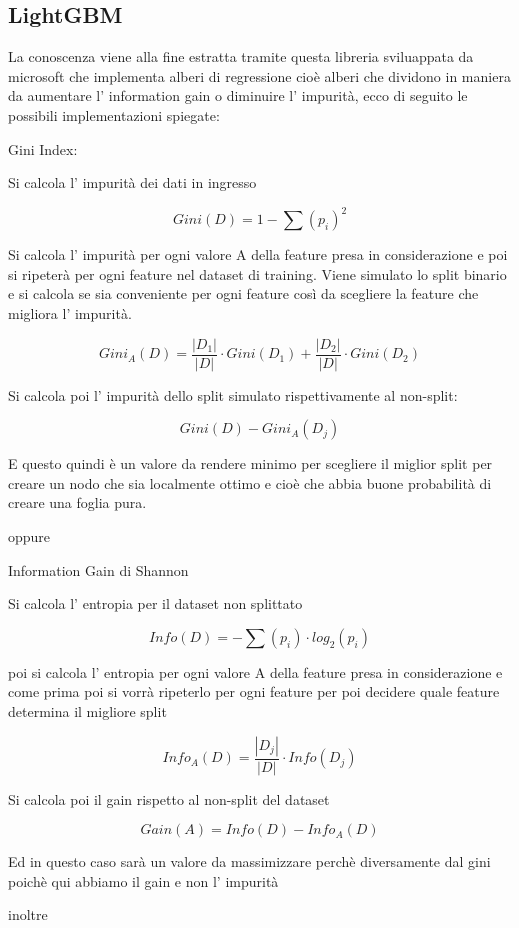 \documentclass[11pt]{article}
\begin{document}
\subsection{LightGBM}\label{lightgbm}

La conoscenza viene alla fine estratta tramite questa libreria
sviluappata da microsoft che implementa alberi di regressione cioè
alberi che dividono in maniera da aumentare l' information gain o
diminuire l' impurità, ecco di seguito le possibili implementazioni
spiegate:

Gini Index:

Si calcola l' impurità dei dati in ingresso

\[Gini(D) = 1 - \sum(p_i)^2\]

Si calcola l' impurità per ogni valore A della feature presa in
considerazione e poi si ripeterà per ogni feature nel dataset di
training. Viene simulato lo split binario e si calcola se sia
conveniente per ogni feature così da scegliere la feature che migliora
l' impurità.

\[Gini_{A}(D) = \frac{|D_1|}{|D|}\cdot Gini(D_1) + \frac{|D_2|}{|D|}\cdot Gini(D_2) \]

Si calcola poi l' impurità dello split simulato rispettivamente al
non-split:

\[Gini(D) - Gini_{A}(D_j)\]

E questo quindi è un valore da rendere minimo per scegliere il miglior
split per creare un nodo che sia localmente ottimo e cioè che abbia
buone probabilità di creare una foglia pura.

oppure

Information Gain di Shannon

Si calcola l' entropia per il dataset non splittato

\[Info(D) = -\sum(p_i)\cdot log_2(p_i)\]

poi si calcola l' entropia per ogni valore A della feature presa in
considerazione e come prima poi si vorrà ripeterlo per ogni feature per
poi decidere quale feature determina il migliore split

\[Info_A(D) = \frac{|D_j|}{|D|}\cdot Info(D_j)\]

Si calcola poi il gain rispetto al non-split del dataset

\[Gain(A) = Info(D) - Info_A(D)\]

Ed in questo caso sarà un valore da massimizzare perchè diversamente dal
gini poichè qui abbiamo il gain e non l' impurità

inoltre
\end{document}

